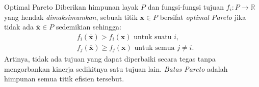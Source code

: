 \begin{definition}{Optimal Pareto}
Diberikan himpunan layak \(P\) dan fungsi-fungsi tujuan \(f_i: P \to \mathbb{R}\) yang hendak \emph{dimaksimumkan}, sebuah titik \(\mathbf{x} \in P\) bersifat \emph{optimal Pareto} jika tidak ada \(\overline{\mathbf{x}} \in P\) sedemikian sehingga:
\[
\begin{aligned}
& f_i(\overline{\mathbf{x}}) > f_i(\mathbf{x}) \text{ untuk suatu } i, \\
& f_j(\overline{\mathbf{x}}) \ge f_j(\mathbf{x}) \text{ untuk semua } j \ne i.
\end{aligned}
\]
Artinya, tidak ada tujuan yang dapat diperbaiki secara tegas tanpa mengorbankan kinerja sedikitnya satu tujuan lain. \emph{Batas Pareto} adalah himpunan semua titik efisien tersebut.
\end{definition}

